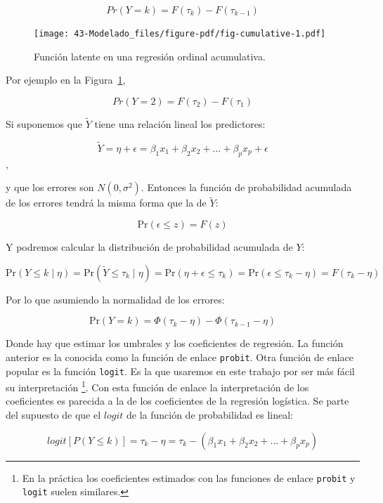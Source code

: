 \documentclass[
  12pt,
  a4paper,
  extrafontsizes,
  onecolumn,
  openright]{memoir}
\begin{document}
\[Pr(Y = k) = F(\tau_k) - F(\tau_{k-1})\]

\begin{figure}[h]

{\centering \texttt{[image: 43-Modelado\_files/figure-pdf/fig-cumulative-1.pdf]}

}

\caption{\label{fig-cumulative}Función latente en una regresión ordinal
acumulativa.}

\end{figure}

Por ejemplo en la Figura~\ref{fig-cumulative},

\[Pr(Y = 2) = F(\tau_2) - F(\tau_{1})\]

Si suponemos que \(\tilde{Y}\) tiene una relación lineal los
predictores:

\[\tilde{Y} = \eta + \epsilon = \beta_1 x_1 + \beta_2 x_2 + ... + \beta_p x_p + \epsilon\],

y que los errores son \(N(0,\sigma^2)\). Entonces la función de
probabilidad acumulada de los errores tendrá la misma forma que la de
\(\tilde{Y}\):

\[\mathrm{Pr}(\epsilon \leq z) = F(z)\]

Y podremos calcular la distribución de probabilidad acumulada de \(Y\):

\[\mathrm{Pr}(Y \leq k \mid \eta) = \mathrm{Pr}(\tilde{Y} \leq \tau_k \mid \eta) = \mathrm{Pr}(\eta + \epsilon \leq \tau_k) = \mathrm{Pr}(\epsilon \leq \tau_k - \eta) = F(\tau_k - \eta)\]

Por lo que asumiendo la normalidad de los errores:

\[\mathrm{Pr}(Y = k) = \Phi(\tau_k - \eta) - \Phi(\tau_{k - 1} - \eta)\]

Donde hay que estimar los umbrales y los coeficientes de regresión. La
función anterior es la conocida como la función de enlace
\texttt{probit}. Otra función de enlace popular es la función
\texttt{logit}. Es la que usaremos en este trabajo por ser más fácil su
interpretación \footnote{En la práctica los coeficientes estimados con
  las funciones de enlace \texttt{probit} y \texttt{logit} suelen
  similares.}. Con esta función de enlace la interpretación de los
coeficientes es parecida a la de los coeficientes de la regresión
logística. Se parte del supuesto de que el \(logit\) de la función de
probabilidad es lineal:

\[logit [P(Y \le k)] = \tau_{k} - \eta = \tau_{k} - (\beta_1 x_1 + \beta_2 x_2 + ... + \beta_p x_p)\]
\end{document}

